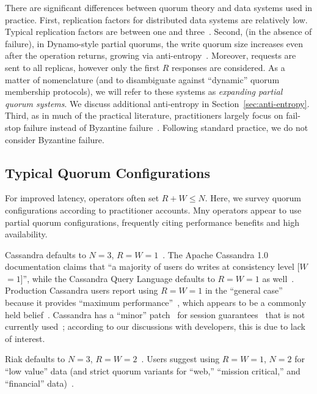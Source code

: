 \documentclass{vldb}
\newcommand{\subsectionskip}{-0em}
\begin{document}
There are significant differences between quorum theory and data
systems used in practice.  First, replication factors for distributed
data systems are relatively low.  Typical replication factors are
between one and three~\cite{cassandradefault, feinbergpc, codapc}.
Second, (in the absence of failure), in Dynamo-style partial quorums,
the write quorum size increases even after the operation returns,
growing via anti-entropy~\cite{antientropy}.  Moreover, requests are
sent to all replicas, however only the first $R$ responses are
considered.  As a matter of nomenclature (and to disambiguate against
``dynamic'' quorum membership protocols), we will refer to these
systems as \textit{expanding partial quorum systems}. We discuss
additional anti-entropy in Section~\ref{sec:anti-entropy}. Third, as
in much of the practical literature, practitioners largely focus on
fail-stop failure instead of Byzantine
failure~\cite{birman-byzantine}.  Following standard practice, we do
not consider Byzantine failure.

\vspace{\subsectionskip}\subsection{Typical Quorum Configurations}

For improved latency, operators often set $R+W \leq N$.  Here, we
survey quorum configurations according to practitioner accounts.  Mny
operators appear to use partial quorum configurations, frequently
citing performance benefits and high availability.

Cassandra defaults to $N$$=$$3$,
$R$$=$$W$$=$$1$~\cite{cassandradefault}. The Apache Cassandra 1.0
documentation claims that ``a majority of users do writes at
consistency level [$W$$=$$1$]'', while the Cassandra Query Language
defaults to $R$$=$$W$$=$$1$ as well~\cite{cassandra-docs}.  Production
Cassandra users report using $R$$=$$W$$=$$1$ in the ``general case''
because it provides ``maximum performance''~\cite{maxperfblog}, which
appears to be a commonly held belief~\cite{reddit, outbrain}.
Cassandra has a ``minor'' patch~\cite{cassandra-session} for session
guarantees~\cite{sessionguarantees} that is not currently
used~\cite{cassandra-session-revert}; according to our
discussions with developers, this is due to lack of interest.

Riak defaults to $N$$=$$3$, $R$$=$$W$$=$$2$~\cite{riakdefault-n,
  riakdefault-rw}. Users suggest using $R$$=$$W$$=$$1$, $N$$=$$2$ for
``low value'' data (and strict quorum variants for ``web,''
``mission critical,'' and ``financial'' data)~\cite{riaktalkone,
  riaktalktwo}.
\end{document}
